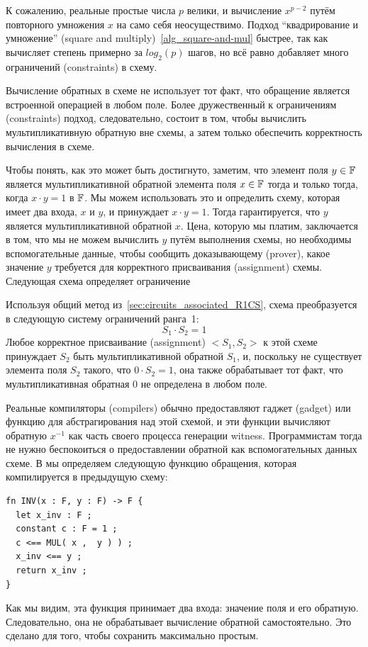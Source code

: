 К сожалению, реальные простые числа $p$ велики, и вычисление $x^{p-2}$ путём повторного умножения $x$ на само себя неосуществимо. Подход ``квадрирование и умножение'' (square and multiply)~\ref{alg_square-and-mul} быстрее, так как вычисляет степень примерно за $log_2(p)$ шагов, но всё равно добавляет много ограничений (constraints) в схему.

Вычисление обратных в схеме не использует тот факт, что обращение является встроенной операцией в любом поле. Более дружественный к ограничениям (constraints) подход, следовательно, состоит в том, чтобы вычислить мультипликативную обратную вне схемы, а затем только обеспечить корректность вычисления в схеме.

Чтобы понять, как это может быть достигнуто, заметим, что элемент поля $y\in \mathbb{F}$ является мультипликативной обратной элемента поля $x\in \mathbb{F}$ тогда и только тогда, когда $x\cdot y =1$ в $\mathbb{F}$. Мы можем использовать это и определить схему, которая имеет два входа, $x$ и $y$, и принуждает $x\cdot y =1$. Тогда гарантируется, что $y$ является мультипликативной обратной $x$. Цена, которую мы платим, заключается в том, что мы не можем вычислить $y$ путём выполнения схемы, но необходимы вспомогательные данные, чтобы сообщить доказывающему (prover), какое значение $y$ требуется для корректного присваивания (assignment) схемы. Следующая схема определяет ограничение
\begin{center}
\label{circ:inversion}
\end{center}
Используя общий метод из~\ref{sec:circuits_associated_R1CS}, схема преобразуется в следующую систему ограничений ранга~1:
\begin{equation}
S_1 \cdot S_2 = 1
\end{equation}
Любое корректное присваивание (assignment) $<S_1,S_2>$ к этой схеме принуждает $S_2$ быть мультипликативной обратной $S_1$, и, поскольку не существует элемента поля $S_2$ такого, что $0\cdot S_2=1$, она также обрабатывает тот факт, что мультипликативная обратная $0$ не определена в любом поле.

Реальные компиляторы (compilers) обычно предоставляют гаджет (gadget) или функцию для абстрагирования над этой схемой, и эти функции вычисляют обратную $x^{-1}$ как часть своего процесса генерации witness. Программистам тогда не нужно беспокоиться о предоставлении обратной как вспомогательных данных схеме. В  мы определяем следующую функцию обращения, которая компилируется в предыдущую схему:
\begin{lstlisting}
fn INV(x : F, y : F) -> F {
  let x_inv : F ;
  constant c : F = 1 ;
  c <== MUL( x ,  y ) ) ;
  x_inv <== y ;
  return x_inv ;
}
\end{lstlisting}
Как мы видим, эта функция принимает два входа: значение поля и его обратную. Следовательно, она не обрабатывает вычисление обратной самостоятельно. Это сделано для того, чтобы сохранить  максимально простым.

